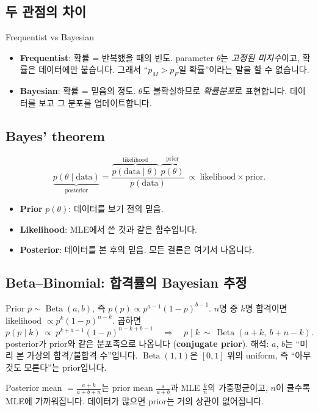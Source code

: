 \documentclass[11pt,a4paper]{article}
\newcommand{\BetaD}{\operatorname{Beta}}
\newcommand{\term}[1]{\textbf{#1}}
\begin{document}
\subsection{두 관점의 차이}
\begin{defbox}{Frequentist vs Bayesian}
\begin{itemize}
\item \term{Frequentist}: 확률 = 반복했을 때의 빈도. parameter $\theta$는 \emph{고정된 미지수}이고, 확률은 데이터에만 붙습니다. 그래서 ``$p_M>p_F$일 확률''이라는 말을 할 수 없습니다.
\item \term{Bayesian}: 확률 = 믿음의 정도. $\theta$도 불확실하므로 \emph{확률분포}로 표현합니다. 데이터를 보고 그 분포를 업데이트합니다.
\end{itemize}
\end{defbox}

\subsection{Bayes' theorem}
\[
\underbrace{p(\theta\mid\text{data})}_{\text{posterior}}=\frac{\overbrace{p(\text{data}\mid\theta)}^{\text{likelihood}}\ \overbrace{p(\theta)}^{\text{prior}}}{p(\text{data})}\ \propto\ \text{likelihood}\times\text{prior}.
\]
\begin{itemize}
\item \term{Prior} $p(\theta)$: 데이터를 보기 전의 믿음.
\item \term{Likelihood}: MLE에서 쓴 것과 같은 함수입니다.
\item \term{Posterior}: 데이터를 본 후의 믿음. 모든 결론은 여기서 나옵니다.
\end{itemize}

\subsection{Beta–Binomial: 합격률의 Bayesian 추정}
Prior $p\sim\BetaD(a,b)$, 즉 $p(p)\propto p^{a-1}(1-p)^{b-1}$. $n$명 중 $k$명 합격이면 likelihood $\propto p^k(1-p)^{n-k}$. 곱하면
\[
p(p\mid k)\ \propto\ p^{k+a-1}(1-p)^{n-k+b-1}\quad\Longrightarrow\quad p\mid k\ \sim\ \BetaD(a+k,\ b+n-k).
\]
posterior가 prior와 같은 분포족으로 나옵니다 (\term{conjugate prior}). 해석: $a$, $b$는 ``미리 본 가상의 합격/불합격 수''입니다. $\BetaD(1,1)$은 $[0,1]$ 위의 uniform, 즉 ``아무것도 모른다''는 prior입니다.

Posterior mean $=\frac{a+k}{a+b+n}$는 prior mean $\frac a{a+b}$과 MLE $\frac kn$의 가중평균이고, $n$이 클수록 MLE에 가까워집니다. 데이터가 많으면 prior는 거의 상관이 없어집니다.
\end{document}
